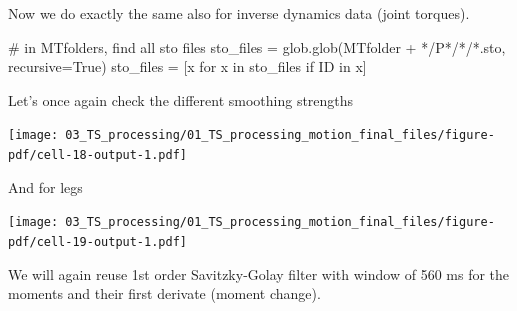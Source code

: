 \documentclass[
  letterpaper,
  DIV=11,
  numbers=noendperiod]{scrreprt}
\newenvironment{Shaded}{\begin{snugshade}}{\end{snugshade}}
\newcommand{\CommentTok}[1]{\textcolor[rgb]{0.37,0.37,0.37}{#1}}
\newcommand{\ControlFlowTok}[1]{\textcolor[rgb]{0.00,0.23,0.31}{#1}}
\newcommand{\KeywordTok}[1]{\textcolor[rgb]{0.00,0.23,0.31}{#1}}
\newcommand{\NormalTok}[1]{\textcolor[rgb]{0.00,0.23,0.31}{#1}}
\newcommand{\OperatorTok}[1]{\textcolor[rgb]{0.37,0.37,0.37}{#1}}
\newcommand{\StringTok}[1]{\textcolor[rgb]{0.13,0.47,0.30}{#1}}
\newcommand{\VariableTok}[1]{\textcolor[rgb]{0.07,0.07,0.07}{#1}}
\begin{document}
Now we do exactly the same also for inverse dynamics data (joint
torques).

\begin{Shaded}
\begin{Highlighting}[]
\CommentTok{\# in MTfolders, find all sto files}
\NormalTok{sto\_files }\OperatorTok{=}\NormalTok{ glob.glob(MTfolder }\OperatorTok{+} \StringTok{\textquotesingle{}*/P*/*/*.sto\textquotesingle{}}\NormalTok{, recursive}\OperatorTok{=}\VariableTok{True}\NormalTok{)}
\NormalTok{sto\_files }\OperatorTok{=}\NormalTok{ [x }\ControlFlowTok{for}\NormalTok{ x }\KeywordTok{in}\NormalTok{ sto\_files }\ControlFlowTok{if} \StringTok{\textquotesingle{}ID\textquotesingle{}} \KeywordTok{in}\NormalTok{ x]}
\end{Highlighting}
\end{Shaded}

Let's once again check the different smoothing strengths

\texttt{[image: 03\_TS\_processing/01\_TS\_processing\_motion\_final\_files/figure-pdf/cell-18-output-1.pdf]}

And for legs

\texttt{[image: 03\_TS\_processing/01\_TS\_processing\_motion\_final\_files/figure-pdf/cell-19-output-1.pdf]}

We will again reuse 1st order Savitzky-Golay filter with window of 560
ms for the moments and their first derivate (moment change).
\end{document}
